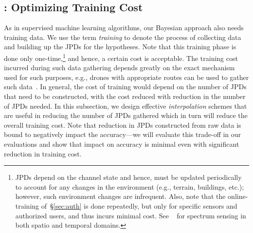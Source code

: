 

\subsection{\ildw: Optimizing Training Cost}
\label{sec:inter}

As in supervised machine learning algorithms, our Bayesian approach
also needs training data.  We use the term
\emph{training} to denote the process of collecting data and building
up the JPDs for the hypotheses. Note that this training phase is done
only one-time,\footnote{JPDs depend on the channel state and
    hence, must be updated periodically to account for any changes in
    the environment (e.g., terrain, buildings, etc.); however, such
    environment changes are infrequent. Also, note that the
    online-training of~\S\ref{sec:auth} is done repeatedly, but only
    for specific sensors and authorized users, and thus incurs minimal
    cost. See ~\cite{mobicom19-bigspec} for spectrum sensing in both spatio and temporal domains. }
and hence, a certain cost is acceptable. The training cost
incurred during such data gathering depends greatly on the exact
mechanism used for such purposes, e.g., drones with appropriate routes
can be used to gather such data~\cite{robot-ref}.  In general, the
cost of training would depend on the number of JPDs that need to be
constructed, with the cost reduced with reduction in the number of
JPDs needed. In this subsection, we design effective {\em interpolation}
schemes that are useful in reducing the number of JPDs gathered which
in turn will reduce the overall training cost. Note that reduction in
JPDs constructed from raw data is bound to negatively impact the
accuracy---we will evaluate this trade-off in our evaluations and show
that impact on accuracy is minimal even with significant reduction in
training cost.

